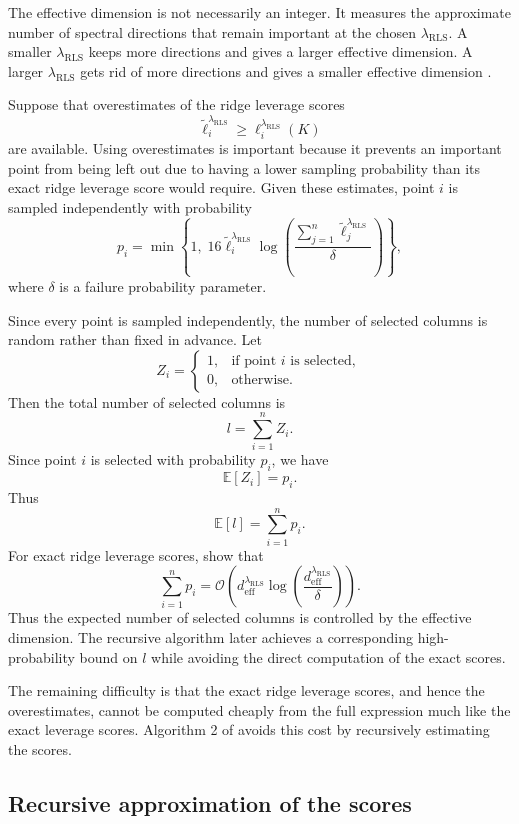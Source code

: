 The effective dimension is not necessarily an integer. It measures the approximate number of spectral directions that remain important at the chosen $\lambda_{\mathrm{RLS}}$. A smaller $\lambda_{\mathrm{RLS}}$ keeps more directions and gives a larger effective dimension. A larger $\lambda_{\mathrm{RLS}}$ gets rid of more directions and gives a smaller effective dimension \citep{zhang2005learning,alaoui2015fast,musco2017recursive}.

Suppose that overestimates of the ridge leverage scores
\[
\widetilde\ell_i^{\lambda_{\mathrm{RLS}}} \geq \ell_i^{\lambda_{\mathrm{RLS}}}(K)
\]
are available. Using overestimates is important because it prevents an important point from being left out due to having a lower sampling probability than its exact ridge leverage score would require. Given these estimates, point $i$ is sampled independently with probability
\[
p_i = \min\left\{1,\; 16\widetilde{\ell}_i^{\lambda_{\mathrm{RLS}}} \log\left(\frac{ \sum_{j=1}^n \widetilde{\ell}_j^{\lambda_{\mathrm{RLS}}} }{\delta }\right)\right\},
\]
where $\delta$ is a failure probability parameter.

Since every point is sampled independently, the number of selected columns is random rather than fixed in advance. Let
\[
Z_i =
\begin{cases}
1, & \text{if point } i \text{ is selected},\\
0, & \text{otherwise}.
\end{cases}
\]
Then the total number of selected columns is
\[
l = \sum_{i=1}^n Z_i.
\]
Since point $i$ is selected with probability $p_i$, we have
\[
\mathbb{E}[Z_i] = p_i.
\]
Thus
\[
\mathbb{E}[l] = \sum_{i=1}^n p_i.
\]
For exact ridge leverage scores, \citet{musco2017recursive} show that
\[
\sum_{i=1}^n p_i = \mathcal{O}\left(d_{\mathrm{eff}}^{\lambda_{\mathrm{RLS}}}\log\left(\frac{d_{\mathrm{eff}}^{\lambda_{\mathrm{RLS}}}}{\delta}\right)\right).
\]
Thus the expected number of selected columns is controlled by the effective dimension. The recursive algorithm later achieves a corresponding high-probability bound on $l$ while avoiding the direct computation of the exact scores.

The remaining difficulty is that the exact ridge leverage scores, and hence the overestimates, cannot be computed cheaply from the full expression much like the exact leverage scores. Algorithm 2 of \citet{musco2017recursive} avoids this cost by recursively estimating the scores.

\subsection{Recursive approximation of the scores}

